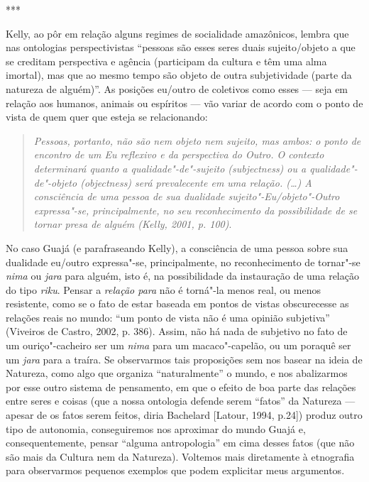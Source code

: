\begin{center}
***
\end{center}

Kelly, ao pôr em relação alguns regimes de socialidade amazônicos,
lembra que nas ontologias perspectivistas ``pessoas são esses seres duais
sujeito/objeto a que se creditam perspectiva e agência (participam da
cultura e têm uma alma imortal), mas que ao mesmo tempo são objeto de
outra subjetividade (parte da natureza de alguém)''. As posições eu/outro
de coletivos como esses --- seja em relação aos humanos, animais ou
espíritos --- vão variar de acordo com o ponto de vista de quem quer que
esteja se relacionando:

\begin{quote}
\emph{Pessoas, portanto, não são nem objeto nem sujeito, mas ambos: o ponto
 de encontro de um Eu reflexivo e da perspectiva do Outro. O contexto
 determinará quanto a qualidade"-de"-sujeito (\emph{subjectness}) ou a
 qualidade"-de"-objeto (\emph{objectness}) será prevalecente em uma
 relação. (\ldots{}) A consciência de uma pessoa de sua
dualidade sujeito"-Eu/objeto"-Outro expressa"-se, principalmente, no seu
reconhecimento da possibilidade de se tornar presa de alguém (Kelly, 2001, p. 100)}.
\end{quote}

No caso Guajá (e parafraseando Kelly), a consciência de uma pessoa sobre
sua dualidade eu/outro expressa"-se, principalmente, no reconhecimento de
tornar"-se \emph{nima} ou \emph{jara} para alguém, isto é, na
possibilidade da instauração de uma relação do tipo \emph{riku}. Pensar
a \emph{relação para} não é torná"-la menos real, ou menos resistente,
como se o fato de estar baseada em pontos de vistas obscurecesse as
relações reais no mundo: ``um ponto de vista não é uma opinião subjetiva''
(Viveiros de Castro, 2002, p. 386). Assim, não há nada de subjetivo no
fato de um ouriço"-cacheiro ser um \emph{nima} para um macaco"-capelão, ou
um poraquê ser um \emph{jara} para a traíra. Se observarmos tais
proposições sem nos basear na ideia de Natureza, como algo que organiza
``naturalmente'' o mundo, e nos abalizarmos por esse outro sistema de
pensamento, em que o efeito de boa parte das relações entre seres e
coisas (que a nossa ontologia defende serem ``fatos'' da Natureza ---
apesar de os fatos serem feitos, diria Bachelard {[}Latour, 1994,
p.24{]}) produz outro tipo de autonomia, conseguiremos nos aproximar do
mundo Guajá e, consequentemente, pensar ``alguma antropologia'' em cima
desses fatos (que não são mais da Cultura nem da Natureza). Voltemos
mais diretamente à etnografia para observarmos pequenos exemplos que
podem explicitar meus argumentos.

